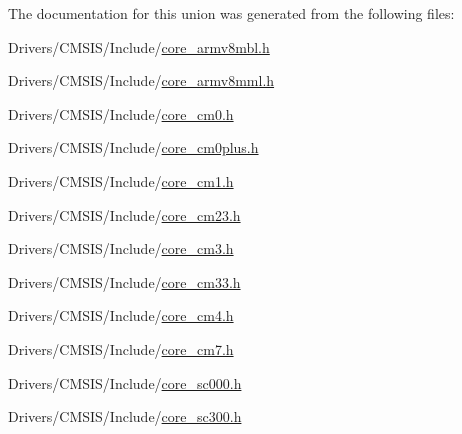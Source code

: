 The documentation for this union was generated from the following files\+:\begin{DoxyCompactItemize}
\item 
Drivers/\+C\+M\+S\+I\+S/\+Include/\mbox{\hyperlink{core__armv8mbl_8h}{core\+\_\+armv8mbl.\+h}}\item 
Drivers/\+C\+M\+S\+I\+S/\+Include/\mbox{\hyperlink{core__armv8mml_8h}{core\+\_\+armv8mml.\+h}}\item 
Drivers/\+C\+M\+S\+I\+S/\+Include/\mbox{\hyperlink{core__cm0_8h}{core\+\_\+cm0.\+h}}\item 
Drivers/\+C\+M\+S\+I\+S/\+Include/\mbox{\hyperlink{core__cm0plus_8h}{core\+\_\+cm0plus.\+h}}\item 
Drivers/\+C\+M\+S\+I\+S/\+Include/\mbox{\hyperlink{core__cm1_8h}{core\+\_\+cm1.\+h}}\item 
Drivers/\+C\+M\+S\+I\+S/\+Include/\mbox{\hyperlink{core__cm23_8h}{core\+\_\+cm23.\+h}}\item 
Drivers/\+C\+M\+S\+I\+S/\+Include/\mbox{\hyperlink{core__cm3_8h}{core\+\_\+cm3.\+h}}\item 
Drivers/\+C\+M\+S\+I\+S/\+Include/\mbox{\hyperlink{core__cm33_8h}{core\+\_\+cm33.\+h}}\item 
Drivers/\+C\+M\+S\+I\+S/\+Include/\mbox{\hyperlink{core__cm4_8h}{core\+\_\+cm4.\+h}}\item 
Drivers/\+C\+M\+S\+I\+S/\+Include/\mbox{\hyperlink{core__cm7_8h}{core\+\_\+cm7.\+h}}\item 
Drivers/\+C\+M\+S\+I\+S/\+Include/\mbox{\hyperlink{core__sc000_8h}{core\+\_\+sc000.\+h}}\item 
Drivers/\+C\+M\+S\+I\+S/\+Include/\mbox{\hyperlink{core__sc300_8h}{core\+\_\+sc300.\+h}}\end{DoxyCompactItemize}
